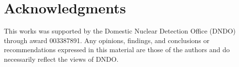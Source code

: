 \documentclass{anstrans}
\begin{document}
\section{Acknowledgments}
This works was supported by the Domestic Nuclear Detection Office (DNDO) through award 003387891.
Any opinions, findings, and conclusions or recommendations expressed in this material are those of the authors and do necessarily reflect the views of DNDO.


\end{document}
